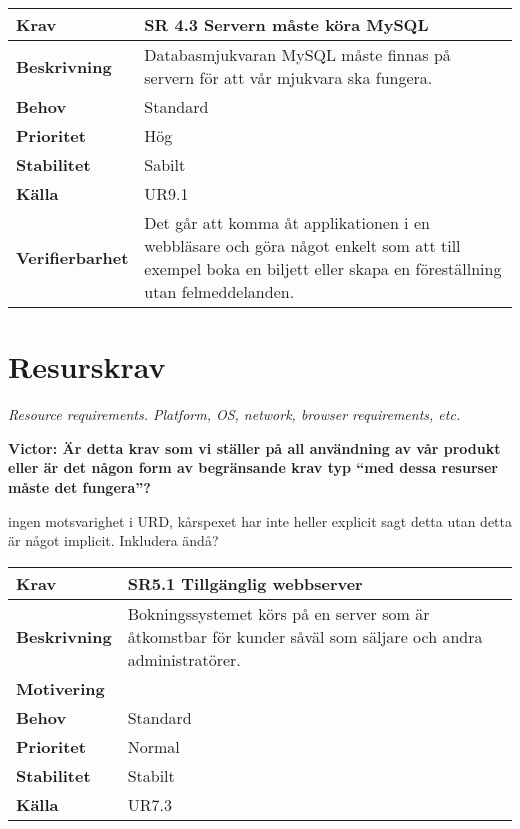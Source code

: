 \documentclass[a4paper, twoside, 11pt, titlepage]{article}
\begin{document}
\begin{tabular} { p{2.6cm} p{12.5cm} }
	\hline
	\sffamily\textbf{Krav} & \sffamily\textbf{SR 4.3 Servern måste köra MySQL } \\
	\hline
	\sffamily\textbf{Beskrivning} & Databasmjukvaran MySQL måste finnas på servern för att vår mjukvara ska fungera.  \\
	\hline
	\sffamily\textbf{Behov} & Standard  \\
	\hline
	\sffamily\textbf{Prioritet} & Hög  \\
	\hline
	\sffamily\textbf{Stabilitet} & Sabilt  \\
	\hline
	\sffamily\textbf{Källa} & UR9.1  \\
	\hline
	\sffamily\textbf{Verifierbarhet} & Det går att komma åt applikationen i en webbläsare och göra något enkelt som att till exempel boka en biljett eller skapa en föreställning utan felmeddelanden.  \\
	\hline
\end{tabular}


\clearpage
\section{Resurskrav}


\emph{Resource requirements. Platform, OS, network, browser requirements, etc.}

\textbf{Victor: Är detta krav som vi ställer på all användning av vår produkt eller är det någon form av begränsande krav typ ``med dessa resurser måste det fungera''?}

ingen motsvarighet i URD, kårspexet har inte heller explicit sagt detta utan detta är något implicit. Inkludera ändå?

\begin{tabular} { p{2.6cm} p{12.5cm} }
	\hline
	\sffamily\textbf{Krav} & \sffamily\textbf{SR5.1 Tillgänglig webbserver } \\
	\hline
	\sffamily\textbf{Beskrivning} & Bokningssystemet körs på en server som är åtkomstbar för kunder såväl som säljare och andra administratörer.  \\
	\hline
	\sffamily\textbf{Motivering} &   \\
	\hline
	\sffamily\textbf{Behov} & Standard  \\
	\hline
	\sffamily\textbf{Prioritet} & Normal  \\
	\hline
	\sffamily\textbf{Stabilitet} & Stabilt  \\
	\hline
	\sffamily\textbf{Källa} & UR7.3  \\
	\hline
\end{tabular}
\vspace{6mm}
\end{document}
